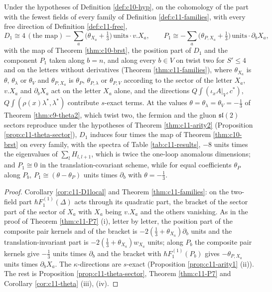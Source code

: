 \begin{corollary}
\label{cor:c11-D1fam}
Under the hypotheses of Definition \ref{def:c10-hyp}, on the cohomology of the part with the fewest fields of every family of Definition \ref{def:c11-families}, with every free direction of Definition \ref{def:c11-free},
\[
D_1\cong4\,(\text{the map})-\sum_a\big(\theta_{X_a}+\tfrac13\big)\,\text{units}\cdot v.X_a,\qquad P_1\cong-\sum_a\big(\theta_{P,X_a}+\tfrac13\big)\,\text{units}\cdot\partial_bX_a,
\]
with the map of Theorem \ref{thm:c10-brst}, the position part of $D_1$ and the component $P_1$ taken along $b=n$, and along every $b\in V$ on twist two for $S'\le4$ and on the letters without derivatives (Theorem \ref{thm:c11-families}), where $\theta_{X_a}$ is $\theta$, $\theta_\lambda$ or $\theta_V$ and $\theta_{P,X_a}$ is $\theta_P$, $\theta_{P,\lambda}$ or $\theta_{P,V}$ according to the sector of the letter $X_a$, $v.X_a$ and $\partial_bX_a$ act on the letter $X_a$ alone, and the directions $Q\int(\iota_xA|_V,c^*)$, $Q\int(\rho(x)\lambda^*,\lambda^*)$ contribute $s$-exact terms. At the values $\theta=\theta_\lambda=\theta_V=-\tfrac13$ of Theorem \ref{thm:c9-theta2}, which twist two, the fermion and the gluon $\mathfrak{sl}(2)$ sectors reproduce under the hypotheses of Theorem \ref{thm:c11-arity2} (Proposition \ref{prop:c11-theta-sector}), $D_1$ induces four times the map of Theorem \ref{thm:c10-brst} on every family, with the spectra of Table \ref{tab:c11-results}, $-8$ units times the eigenvalues of $\sum_lH_{l,l+1}$, which is twice the one-loop anomalous dimensions; and $P_1\cong0$ in the translation-covariant scheme, while for equal coefficients $\theta_P$ along $P_b$, $P_1\cong(\theta-\theta_P)$ units times $\partial_b$ with $\theta=-\tfrac13$.
\end{corollary}

\begin{proof}
Corollary \ref{cor:c11-D1local} and Theorem \ref{thm:c11-families}: on the two-field part $\hbar F_1^{(1)}(\Delta)$ acts through its quadratic part, the bracket of the sector part of the sector of $X_a$ with $X_a$ being $v.X_a$ and the others vanishing. As in the proof of Theorem \ref{thm:c11-P7} (i), letter by letter, the position part of the composite pair kernels and of the bracket is $-2(\tfrac13+\theta_{X_a})\partial_b$ units and the translation-invariant part is $-2(\tfrac13+\theta_{X_a})w_{X_a}$ units; along $P_b$ the composite pair kernels give $-\tfrac13$ units times $\partial_b$ and the bracket with $\hbar F_1^{(1)}(P_b)$ gives $-\theta_{P,X_a}$ units times $\partial_bX_a$. The $\kappa$-directions are $s$-exact (Proposition \ref{prop:c11-arity1} (ii)). The rest is Proposition \ref{prop:c11-theta-sector}, Theorem \ref{thm:c11-P7} and Corollary \ref{cor:c11-theta} (iii), (iv).
\end{proof}

